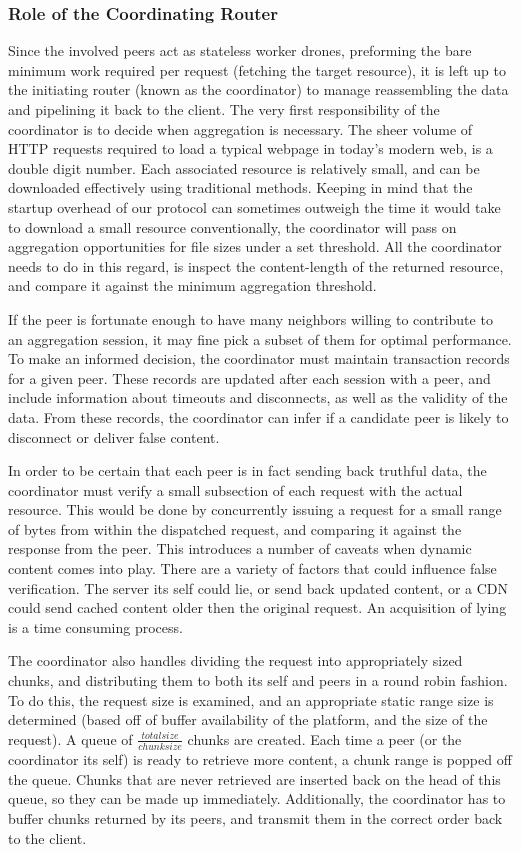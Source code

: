 \documentclass[12pt]{article}
\begin{document}
		\subsubsection{Role of the Coordinating Router}

			Since the involved peers act as stateless worker drones, preforming the bare minimum work required per request (fetching the target resource), it is left up to the initiating router (known as the coordinator) to manage reassembling the data and pipelining it back to the client. The very first responsibility of the coordinator is to decide when aggregation is necessary. The sheer volume of HTTP requests required to load a typical webpage in today's modern web, is a double digit number. Each associated resource is relatively small, and can be downloaded effectively using traditional methods. Keeping in mind that the startup overhead of our protocol can sometimes outweigh the time it would take to download a small resource conventionally, the coordinator will pass on aggregation opportunities for file sizes under a set threshold. All the coordinator needs to do in this regard, is inspect the content-length of the returned resource, and compare it against the minimum aggregation threshold.

			If the peer is fortunate enough to have many neighbors willing to contribute to an aggregation session, it may fine pick a subset of them for optimal performance. To make an informed decision, the coordinator must maintain transaction records for a given peer. These records are updated after each session with a peer, and include information about timeouts and disconnects, as well as the validity of the data. From these records, the coordinator can infer if a candidate peer is likely to disconnect or deliver false content.

			In order to be certain that each peer is in fact sending back truthful data, the coordinator must verify a small subsection of each request with the actual resource. This would be done by concurrently issuing a request for a small range of bytes from within the dispatched request, and comparing it against the response from the peer. This introduces a number of caveats when dynamic content comes into play. There are a variety of factors that could influence false verification. The server its self could lie, or send back updated content, or a CDN could send cached content older then the original request. An acquisition of lying is a time consuming process. 

			The coordinator also handles dividing the request into appropriately sized chunks, and distributing them to both its self and peers in a round robin fashion. To do this, the request size is examined, and an appropriate static range size is determined (based off of buffer availability of the platform, and the size of the request). A queue of $\frac{total size}{chunk size}$ chunks are created. Each time a peer (or the coordinator its self) is ready to retrieve more content, a chunk range is popped off the queue. Chunks that are never retrieved are inserted back on the head of this queue, so they can be made up immediately. Additionally, the coordinator has to buffer chunks returned by its peers, and transmit them in the correct order back to the client. 
\end{document}
